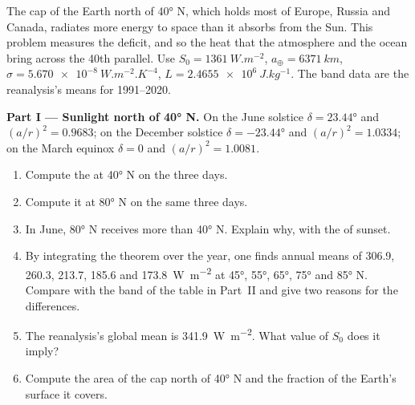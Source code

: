 \begin{problem}
\label{pb:b1:radiation-heat-transport:1}
The cap of the Earth north of \ang{40} N, which holds most of Europe, Russia
and Canada, radiates more energy to space than it absorbs from
the Sun. This problem measures the deficit, and so the heat that the atmosphere and
the ocean bring across the 40th parallel. Use $S_0 = \qty{1361}{W.m^{-2}}$,
$a_\oplus = \qty{6371}{km}$, $\sigma = \qty{5.670e-8}{W.m^{-2}.K^{-4}}$, $L =
\qty{2.4655e6}{J.kg^{-1}}$. The band data are the reanalysis's means for 1991--2020.

\medskip
\noindent\textbf{Part I --- Sunlight north of \ang{40} N.} On the June solstice
$\delta = \ang{23.44}$ and $(a/r)^2 = 0.9683$; on the December solstice $\delta =
\ang{-23.44}$ and $(a/r)^2 = 1.0334$; on the March equinox $\delta = 0$ and
$(a/r)^2 = 1.0081$.
\begin{enumerate}
  \item Compute the  at \ang{40} N on the three days.
  \item Compute it at \ang{80} N on the same three days.
  \item In June, \ang{80} N receives more than \ang{40} N. Explain why, with the
         of sunset.
  \item By integrating the theorem over the year, one finds annual means of
        \qty{306.9}{}, \qty{260.3}{}, \qty{213.7}{}, \qty{185.6}{} and
        \qty{173.8}{W.m^{-2}} at \ang{45}, \ang{55}, \ang{65}, \ang{75} and
        \ang{85} N. Compare with the band  of the table in Part~II and
        give two reasons for the differences.
  \item The reanalysis's global mean  is \qty{341.9}{W.m^{-2}}. What
        value of $S_0$ does it imply?
  \item Compute the area of the cap north of \ang{40} N and the fraction of the
        Earth's surface it covers.
\end{enumerate}


\end{problem}
